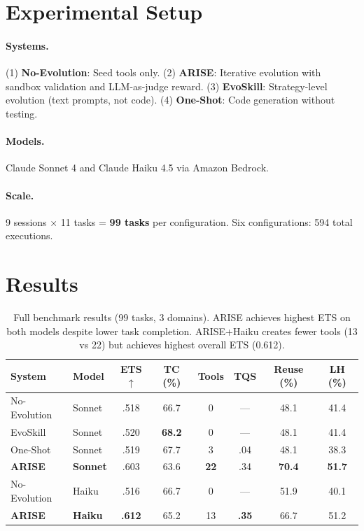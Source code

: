 \documentclass[10pt,twocolumn]{article}
\begin{document}
\section{Experimental Setup}

\paragraph{Systems.} (1) \textbf{No-Evolution}: Seed tools only. (2) \textbf{ARISE}: Iterative evolution with sandbox validation and LLM-as-judge reward. (3) \textbf{EvoSkill}: Strategy-level evolution (text prompts, not code). (4) \textbf{One-Shot}: Code generation without testing.

\paragraph{Models.} Claude Sonnet 4 and Claude Haiku 4.5 via Amazon Bedrock.

\paragraph{Scale.} 9 sessions $\times$ 11 tasks = \textbf{99 tasks} per configuration. Six configurations: 594 total executions.

\section{Results}

\begin{table}[t]
\centering
\small
\begin{tabular}{llcccccc}
\toprule
\textbf{System} & \textbf{Model} & \textbf{ETS}$\uparrow$ & \textbf{TC (\%)} & \textbf{Tools} & \textbf{TQS} & \textbf{Reuse (\%)} & \textbf{LH (\%)} \\
\midrule
No-Evolution & Sonnet & .518 & 66.7 & 0 & --- & 48.1 & 41.4 \\
EvoSkill & Sonnet & .520 & \textbf{68.2} & 0 & --- & 48.1 & 41.4 \\
One-Shot & Sonnet & .519 & 67.7 & 3 & .04 & 48.1 & 38.3 \\
\textbf{ARISE} & \textbf{Sonnet} & .603 & 63.6 & \textbf{22} & .34 & \textbf{70.4} & \textbf{51.7} \\
\midrule
No-Evolution & Haiku & .516 & 66.7 & 0 & --- & 51.9 & 40.1 \\
\textbf{ARISE} & \textbf{Haiku} & \textbf{.612} & 65.2 & 13 & \textbf{.35} & 66.7 & 51.2 \\
\bottomrule
\end{tabular}
\caption{Full benchmark results (99 tasks, 3 domains). ARISE achieves highest ETS on both models despite lower task completion. ARISE+Haiku creates fewer tools (13 vs 22) but achieves highest overall ETS (0.612).}
\label{tab:results}
\end{table}
\end{document}
